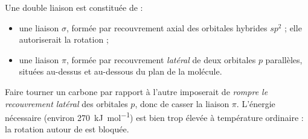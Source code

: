 \documentclass[11pt]{article}
\newcommand{\cle}[1]{{\popxbold\color{popdark}#1}}
\begin{document}
\begin{propriete}[Structure de la double liaison C=C]
Une double liaison  est constituée de :
\begin{itemize}
\item une \cle{liaison $\sigma$}, formée par recouvrement axial des orbitales hybrides $sp^2$ ; elle autoriserait la rotation ;
\item une \cle{liaison $\pi$}, formée par recouvrement \emph{latéral} de deux orbitales $p$ parallèles, situées au-dessus et au-dessous du plan de la molécule.
\end{itemize}
Faire tourner un carbone par rapport à l'autre imposerait de \emph{rompre le recouvrement latéral} des orbitales $p$, donc de casser la liaison $\pi$. L'énergie nécessaire (environ \SI{270}{kJ.mol^{-1}}) est bien trop élevée à température ordinaire : la rotation autour de  est \cle{bloquée}.
\end{propriete}
\end{document}
